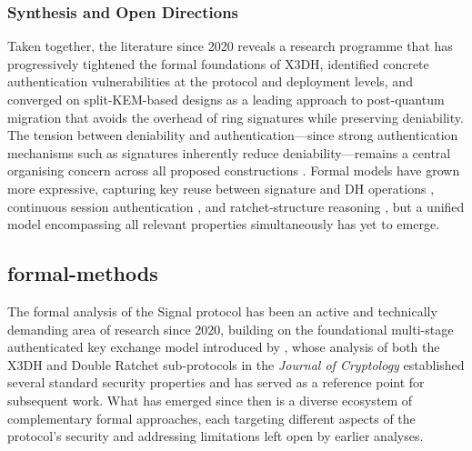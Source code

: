 \subsubsection{Synthesis and Open Directions}

Taken together, the literature since 2020 reveals a research programme that has progressively tightened the formal foundations of X3DH, identified concrete authentication vulnerabilities at the protocol and deployment levels, and converged on split-KEM-based designs as a leading approach to post-quantum migration that avoids the overhead of ring signatures while preserving deniability. The tension between deniability and authentication—since strong authentication mechanisms such as signatures inherently reduce deniability—remains a central organising concern across all proposed constructions \parencite{brendel2022,collins2024b,niot2025,fiedler2025}. Formal models have grown more expressive, capturing key reuse between signature and DH operations \parencite{fiedler2025}, continuous session authentication \parencite{dowling2022}, and ratchet-structure reasoning \parencite{xiao2025,li2024}, but a unified model encompassing all relevant properties simultaneously has yet to emerge.

\subsection{formal-methods}

The formal analysis of the Signal protocol has been an active and technically demanding area of research since 2020, building on the foundational multi-stage authenticated key exchange model introduced by \textcite{cohn-gordon2020}, whose analysis of both the X3DH and Double Ratchet sub-protocols in the \textit{Journal of Cryptology} established several standard security properties and has served as a reference point for subsequent work. What has emerged since then is a diverse ecosystem of complementary formal approaches, each targeting different aspects of the protocol's security and addressing limitations left open by earlier analyses.

